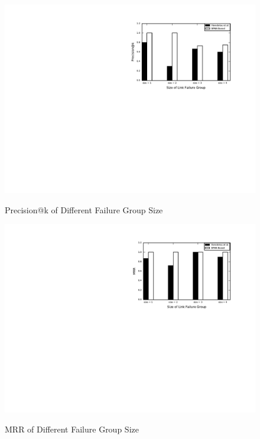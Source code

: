 \documentclass{sig-alternate-05-2015}
\begin{document}
\begin{figure}[t]
  \centering
  \includegraphics[scale=0.7]{precision} \\
  \caption{Precision@k of Different Failure Group Size}
\end{figure}
\begin{figure}[t]
  \centering
  \includegraphics[scale=0.7]{mrr} \\
  \caption{MRR of Different Failure Group Size}
\end{figure}
\end{document}
